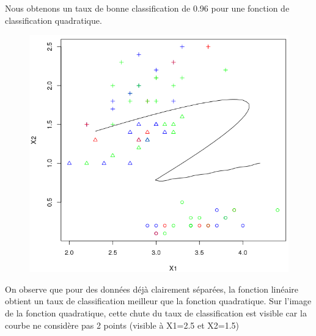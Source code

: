 \documentclass[a4paper,12pt]{report}
\begin{document}
Nous obtenons un taux de bonne classification de 0.96 pour une fonction de classification quadratique.

\begin{figure}[!ht]
	\center
	\includegraphics[scale=0.4]{image/q5_2.png}
\end{figure}

On observe que pour des données déjà clairement séparées, la fonction linéaire obtient un taux de classification meilleur que la fonction quadratique. Sur l'image de la fonction quadratique, cette chute du taux de classification est visible car la courbe ne considère pas 2 points (visible à X1=2.5 et X2=1.5)
\newpage
\end{document}
